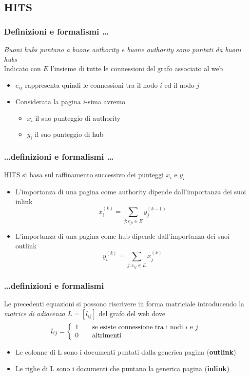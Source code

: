 \documentclass{beamer}
\begin{document}

\subsection{HITS}
\begin{frame}
	\frametitle{Definizioni e formalismi \dots}
	\emph{Buoni hubs puntano a buone authority e buone authority sono puntati da buoni hubs}\\
	Indicato con $E$ l'insieme di tutte le connessioni del grafo associato al web
	\begin{itemize}
		\item $e_{ij}$ rappresenta quindi le connessioni tra il nodo $i$ ed il nodo $j$
		\item Considerata la pagina $i$-sima avremo
		\begin{itemize}
			\item $x_i$ il suo punteggio di authority
			\item $y_i$ il suo punteggio di hub
		\end{itemize}
	\end{itemize}
\end{frame}

\begin{frame}
	\frametitle{\dots definizioni e formalismi \dots}
	HITS si basa sul raffinamento successivo dei punteggi $x_i$ e $y_i$
	\begin{itemize}
		\item L'importanza di una pagina come authority dipende dall'importanza dei suoi inlink $$x_i^{(k)}=\sum_{j:e_{ji}\in E}y_j^{(k-1)}$$
		\item L'importanza di una pagina come hub dipende dall'importanza dei suoi outlink $$y_i^{(k)}=\sum_{j:e_{ij}\in E}x_j^{(k)}$$
	\end{itemize}
\end{frame}
\begin{frame}
	\frametitle{\dots definizioni e formalismi}
	Le precedenti equazioni si possono riscrivere in forma matriciale introducendo la \emph{matrice di adiacenza} $L=[l_{ij}]$ del grafo del web dove
	\[ l_{ij} = \left\{ 
	\begin{array}{l l}
	1 & \quad \text{se esiste connessione tra i nodi $i$ e $j$}\\
	0 & \quad \text{altrimenti}
	\end{array} \right.\]
	\begin{itemize}
		\item Le colonne di L sono i documenti puntati dalla generica pagina (\textbf{outlink})
		\item Le righe di L sono i documenti che puntano la generica pagina (\textbf{inlink})
	\end{itemize}
\end{frame}
\end{document}

